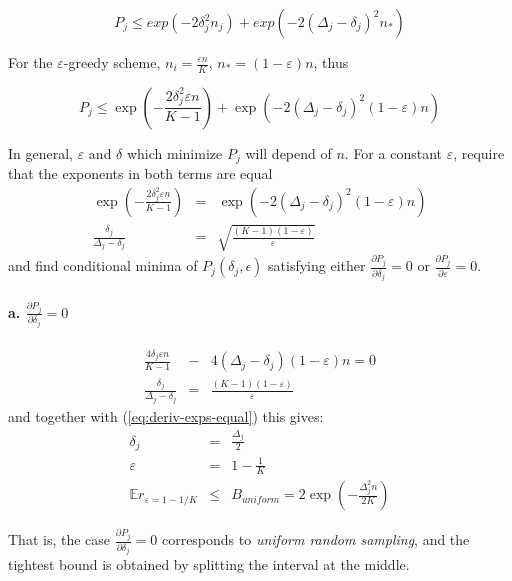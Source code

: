 \documentclass{article}
\newcommand {\IE} {\ensuremath {\mathbb{E}}}
\begin{document}
\begin{equation}
P_j\le exp\left(-2\delta_j^2n_j\right)+exp\left(-2(\Delta_j-\delta_j)^2n_*\right)
\end{equation}

For the $\varepsilon$-greedy scheme, $n_i=\frac {\varepsilon n} K$,
$n_*=(1-\varepsilon)n$, thus

\begin{equation}
P_j \le \exp\left(-\frac {2\delta_j^2\varepsilon n} {K-1}\right) +\exp\left(-2(\Delta_j-\delta_j)^2(1-\varepsilon)n\right)
\end{equation}

In general, $\varepsilon$ and $\delta$ which minimize $P_j$ will
depend of $n$. For a constant $\varepsilon$, require that the
exponents in both terms are equal
\begin{eqnarray}
\exp\left(-\frac {2\delta_j^2\varepsilon n} {K-1}\right)
   &=& \exp\left(-2(\Delta_j-\delta_j)^2(1-\varepsilon)n\right)\\
\frac {\delta_j} {\Delta_j - \delta_j}
   &=& \sqrt { \frac {(K-1)(1-\varepsilon)} \varepsilon }
\label{eq:deriv-exps-equal}
\end{eqnarray}
and find conditional minima of $P_j(\delta_j, \epsilon)$ satisfying
either $\frac {\partial P_j} {\partial \delta_j}=0$ or $\frac {\partial P_j}
{\partial \varepsilon}=0$. 

\vspace{1em}
\paragraph{a. {\large $\frac {\partial P_j} {\partial \delta_j}=0$}}

\begin{eqnarray*}
\frac {4\delta_j\varepsilon n} {K-1}
  &-& 4(\Delta_j-\delta_j)(1-\varepsilon)n=0\\
\frac {\delta_j} {\Delta_j-\delta_j}&=&{ \frac {(K-1)(1-\varepsilon)} \varepsilon }
\end{eqnarray*}
and together with (\ref{eq:deriv-exps-equal}) this gives:
\begin{eqnarray}
\delta_j&=&\frac {\Delta_j} 2\nonumber\\
\varepsilon&=&1-\frac 1 K\nonumber\\
\IE r_{\varepsilon=1-1/K}&\le&B_{uniform}=2\exp\left(-\frac {\Delta_j^2n} {2K}\right)
\label{eq:deriv-uniform-sampling}
\end{eqnarray}

That is, the case $\frac {\partial P_j} {\partial \delta_j}=0$
corresponds to \emph{uniform random sampling}, and the tightest bound is obtained
by splitting the interval at the middle.
\end{document}
